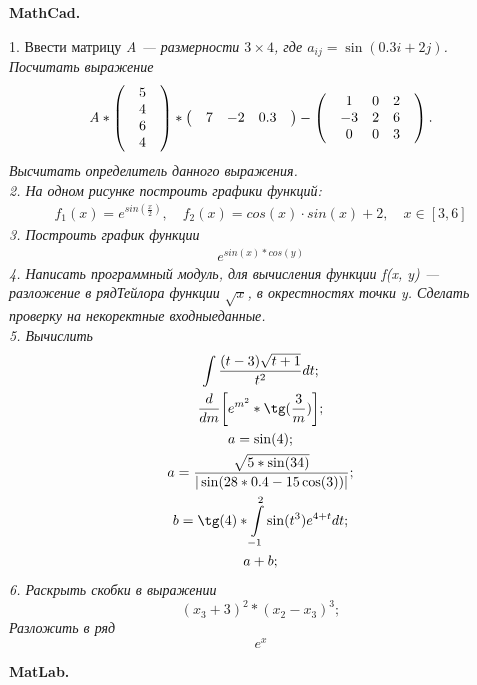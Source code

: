 \documentclass[12pt]{article}
\begin{document}
\begin{center}
\bf \Large MathCad.
\end{center}
1. Ввести матрицу \it A \rm --- размерности $3 \times 4$, где $a_{ij} = \sin (0.3i+2j)$. Посчитать выражение
\[\it A \rm \ast 
\begin{pmatrix} 
& 5 & \\ 
& 4 & \\ 
& 6 & \\ 
& 4 & 
\end{pmatrix}
\ast 
\begin{pmatrix}
& 7 & -2 & 0.3 &
\end{pmatrix}
-
\begin{pmatrix}
& 1 & 0 & 2 &\\
& -3 & 2 & 6 &\\
& 0 & 0 & 3 &\\
\end{pmatrix}
.
\]
Высчитать определитель данного выражения.\\
2. На одном рисунке построить графики функций:
\begin {align*}
f_1(x)=e^{sin(\frac{x}{2})}, \quad f_2(x)=cos(x)\cdot sin(x)+2, \quad x \in [3,6]
\end {align*}
3. Построить график функции
\begin {align*}
e^{sin(x) \ast cos(y)}
\end {align*}
4. Написать программный модуль, для вычисления функции \it f(x, y) \rm --- разложение в ряд\linebreak Тейлора функции $ \sqrt{x} $, в окрестностях точки \it y\rm. Сделать проверку на некоректные входные\linebreak данные.\\
5. Вычислить
\begin {gather*}
\int \frac{(t-3)\sqrt{t+1}}{t^2}dt;\\
\frac{d}{dm}\biggl[e^{m^2} \ast \tg(\frac{3}{m})\biggr];\\
a=\sin(4);\\
a=\frac{\sqrt{5 \ast \sin(34)}}{|\sin(28 \ast 0.4 - 15\cos(3))|};\\
b=\tg(4) \ast \int\limits_{-1}^2  \sin(t^3)e^{4+t}dt;\\
a+b;
\end{gather*}
6.  Раскрыть скобки в выражении\\ 
\begin {equation*}
(x_3+3)^2 \ast (x_2-x_3)^3;
\end {equation*}
 Разложить в ряд $$e^x$$
\begin{center}
\bf \Large MatLab.
\end{center}
\end{document}
